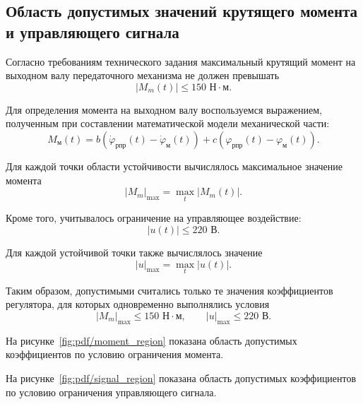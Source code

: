 \subsection{Область допустимых значений крутящего момента и управляющего сигнала}

Согласно требованиям технического задания максимальный крутящий момент на выходном валу передаточного механизма не должен превышать
\begin{equation}
|M_m(t)| \le 150 \text{ Н}\cdot\text{м}.
\end{equation}

Для определения момента на выходном валу воспользуемся выражением, полученным при составлении математической модели механической части:
\begin{equation}
    M_{\text{м}}(t)
    =
    b
    \left(
        \dot{\varphi}_{\text{рпр}}(t)
        -
        \dot{\varphi}_{\text{м}}(t)
    \right)
    +
    c
    \left(
        \varphi_{\text{рпр}}(t)
        -
        \varphi_{\text{м}}(t)
    \right).
\end{equation}

Для каждой точки области устойчивости вычислялось максимальное значение момента
\begin{equation}
|M_m|_{\max}=\max_t |M_m(t)|.
\end{equation}

Кроме того, учитывалось ограничение на управляющее воздействие:
\begin{equation}
|u(t)| \le 220 \text{ В}.
\end{equation}

Для каждой устойчивой точки также вычислялось значение
\begin{equation}
|u|_{\max}=\max_t |u(t)|.
\end{equation}

Таким образом, допустимыми считались только те значения коэффициентов регулятора, для которых одновременно выполнялись условия
\begin{equation}
|M_m|_{\max} \le 150 \text{ Н}\cdot\text{м},
\qquad
|u|_{\max} \le 220 \text{ В}.
\end{equation}

На рисунке~\ref{fig:pdf/moment_region} показана область допустимых коэффициентов по условию ограничения момента.


На рисунке~\ref{fig:pdf/signal_region} показана область допустимых коэффициентов по условию ограничения управляющего сигнала.

